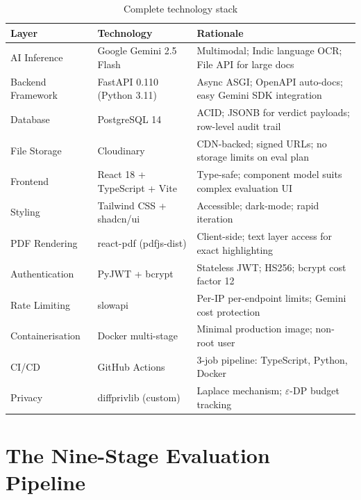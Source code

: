 \documentclass[12pt,a4paper]{article}
\begin{document}
\begin{table}[H]
\centering
\begin{tabularx}{\linewidth}{@{}llX@{}}
\toprule
\textbf{Layer} & \textbf{Technology} & \textbf{Rationale} \\
\midrule
AI Inference       & Google Gemini 2.5 Flash      & Multimodal; Indic language OCR; File API for large docs \\
Backend Framework  & FastAPI 0.110 (Python 3.11)  & Async ASGI; OpenAPI auto-docs; easy Gemini SDK integration \\
Database           & PostgreSQL 14                & ACID; JSONB for verdict payloads; row-level audit trail \\
File Storage       & Cloudinary                   & CDN-backed; signed URLs; no storage limits on eval plan \\
Frontend           & React 18 + TypeScript + Vite & Type-safe; component model suits complex evaluation UI \\
Styling            & Tailwind CSS + shadcn/ui     & Accessible; dark-mode; rapid iteration \\
PDF Rendering      & react-pdf (pdfjs-dist)       & Client-side; text layer access for exact highlighting \\
Authentication     & PyJWT + bcrypt               & Stateless JWT; HS256; bcrypt cost factor 12 \\
Rate Limiting      & slowapi                      & Per-IP per-endpoint limits; Gemini cost protection \\
Containerisation   & Docker multi-stage           & Minimal production image; non-root user \\
CI/CD              & GitHub Actions               & 3-job pipeline: TypeScript, Python, Docker \\
Privacy            & diffprivlib (custom)         & Laplace mechanism; $\varepsilon$-DP budget tracking \\
\bottomrule
\end{tabularx}
\caption{Complete technology stack}
\end{table}

\section{The Nine-Stage Evaluation Pipeline}
\end{document}
